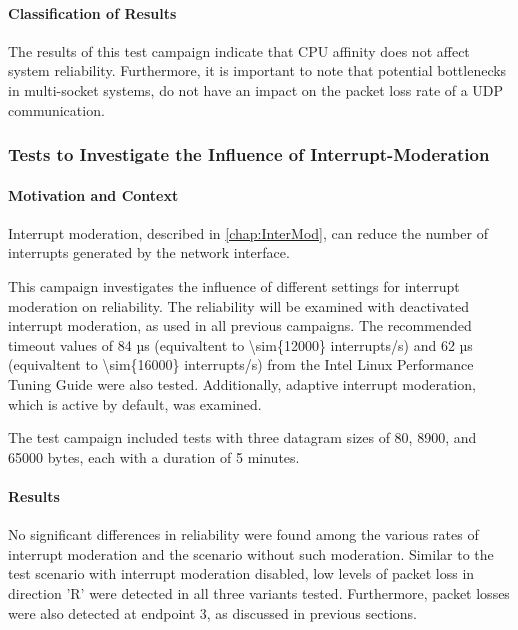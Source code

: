 \paragraph{Classification of Results}
The results of this test campaign indicate that CPU affinity does not affect system reliability. Furthermore, it is important to note that potential bottlenecks in multi-socket systems, do not have an impact on the packet loss rate of a UDP communication.


\subsubsection{Tests to Investigate the Influence of Interrupt-Moderation} \label{chap:RelInterMod}
\paragraph{Motivation and Context}

Interrupt moderation, described in \ref{chap:InterMod}, can reduce the number of interrupts generated by the network interface.

This campaign investigates the influence of different settings for interrupt moderation on reliability. The reliability will be examined with deactivated interrupt moderation, as used in all previous campaigns. The recommended timeout values of 84 µs (equivaltent to \num{\sim{12000}} interrupts/s) and 62 µs (equivaltent to \num{\sim{16000}} interrupts/s) from the Intel Linux Performance Tuning Guide \cite{intermod03} were also tested. Additionally, adaptive interrupt moderation, which is active by default, was examined.  

The test campaign included tests with three datagram sizes of 80, 8900, and 65000 bytes, each with a duration of 5 minutes.

\paragraph{Results}
No significant differences in reliability were found among the various rates of interrupt moderation and the scenario without such moderation. Similar to the test scenario with interrupt moderation disabled, low levels of packet loss in direction 'R' were detected in all three variants tested. Furthermore, packet losses were also detected at endpoint 3, as discussed in previous sections.

